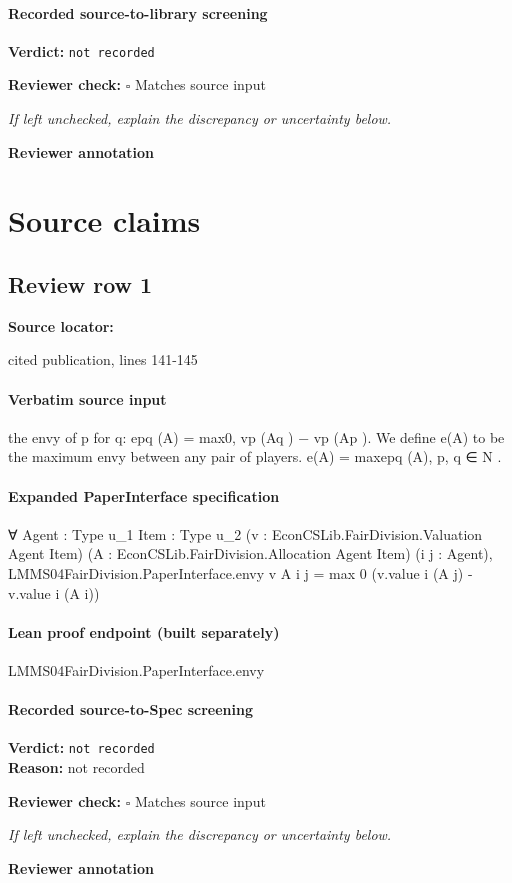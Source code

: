 \documentclass[10pt]{article}
\newcommand{\reviewerbox}{%
  \par\noindent\fbox{\parbox{0.96\linewidth}{\rule{0pt}{0.38in}}}\par
}
\newcommand{\reviewmatch}[1]{%
  \par\noindent\textbf{Reviewer check:} $\square$\; #1\par
  \noindent\emph{If left unchecked, explain the discrepancy or uncertainty below.}\par
}
\begin{document}
\paragraph{Recorded source-to-library screening}
\textbf{Verdict:} \texttt{not recorded}
\reviewmatch{Matches source input}
\noindent\textbf{Reviewer annotation}\par
\reviewerbox

\clearpage
\hypertarget{source-claim-53633897e55ca628}{}
\hypertarget{source-section-f10b5f68e4acf3dc}{}
\section*{Source claims}
\subsection*{Review row 1}
\textbf{Source locator:} {\footnotesize\raggedright cited publication, lines 141-\allowbreak{}145\par}
\paragraph{Verbatim source input}
\begin{ReviewVerbatim}
the envy of p for q:
epq (A) = max{0, vp (Aq ) − vp (Ap )}.
We define e(A) to be the maximum envy between any pair
of players.
e(A) = max{epq (A), p, q ∈ N }.
\end{ReviewVerbatim}


\paragraph{Expanded PaperInterface specification}
\begin{ReviewVerbatim}
∀ {Agent : Type u_1} {Item : Type u_2} (v : EconCSLib.FairDivision.Valuation Agent Item)
  (A : EconCSLib.FairDivision.Allocation Agent Item) (i j : Agent),
  LMMS04FairDivision.PaperInterface.envy v A i j = max 0 (v.value i (A j) - v.value i (A i))
\end{ReviewVerbatim}

\paragraph{Lean proof endpoint (built separately)}\begin{ReviewVerbatim}
LMMS04FairDivision.PaperInterface.envy
\end{ReviewVerbatim}

\paragraph{Recorded source-to-Spec screening}
\textbf{Verdict:} \texttt{not recorded}
\\
\textbf{Reason:} not recorded
\reviewmatch{Matches source input}
\noindent\textbf{Reviewer annotation}\par
\reviewerbox
\clearpage
\hypertarget{source-claim-6565bf051b780aba}{}
\end{document}

